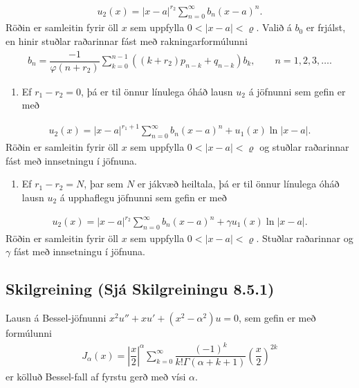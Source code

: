 \documentclass[a4paper,10pt,icelandic]{sphinxmanual}
\begin{document}
\begin{equation*}
\begin{split}u_2(x)=|x-a|^{r_2}\sum_{n=0}^\infty b_n(x-a)^n.\end{split}
\end{equation*}
Röðin er samleitin fyrir öll \(x\) sem uppfylla \(0<|x-a|<\varrho\). Valið á \(b_0\) er frjálst, en hinir stuðlar raðarinnar fást með rakningarformúlunni
\begin{equation*}
\begin{split}b_n=\dfrac{-1}{\varphi(n+r_2)}
\sum_{k=0}^{n-1}((k+r_2)p_{n-k}+q_{n-k})b_k, \qquad n=1,2,3,\dots.\end{split}
\end{equation*}\begin{enumerate}
%
\setcounter{enumi}{2}
\item {} 
Ef \(r_1-r_2=0\), þá er til önnur línulega óháð lausn \(u_2\) á jöfnunni sem gefin er með

\end{enumerate}
\begin{equation*}
\begin{split}u_2(x)=|x-a|^{r_1+1}\sum_{n=0}^\infty b_n(x-a)^n+
u_1(x)\ln|x-a|.\end{split}
\end{equation*}
Röðin er samleitin fyrir öll \(x\) sem uppfylla \(0<|x-a|<\varrho\) og stuðlar raðarinnar fást með innsetningu í jöfnuna.
\begin{enumerate}
%
\setcounter{enumi}{3}
\item {} 
Ef \(r_1-r_2=N\), þar sem \(N\) er jákvæð heiltala, þá er til önnur línulega óháð lausn \(u_2\) á upphaflegu jöfnunni sem gefin er með

\end{enumerate}
\begin{equation*}
\begin{split}u_2(x)=|x-a|^{r_2}\sum_{n=0}^\infty b_n(x-a)^n+
\gamma u_1(x)\ln|x-a|.\end{split}
\end{equation*}
Röðin er samleitin fyrir öll \(x\) sem uppfylla \(0<|x-a|<\varrho\). Stuðlar raðarinnar og \(\gamma\) fást með innsetningu í jöfnuna.


\subsection{Skilgreining (Sjá Skilgreiningu 8.5.1)}
\label{\detokenize{Kafli08:skilgreining-sja-skilgreiningu-8-5-1}}
Lausn á Bessel-jöfnunni \(x^2u''+xu'+(x^2-\alpha^2)u=0\), sem gefin er með formúlunni
\begin{equation*}
\begin{split}J_\alpha(x)=\left|\dfrac x2\right|^\alpha\sum_{k=0}^\infty
\dfrac{(-1)^k}{k!\Gamma(\alpha+k+1)}\left( \dfrac x2\right)^{2k}\end{split}
\end{equation*}
er kölluð Bessel-fall af fyrstu gerð með vísi \(\alpha\).
\end{document}
